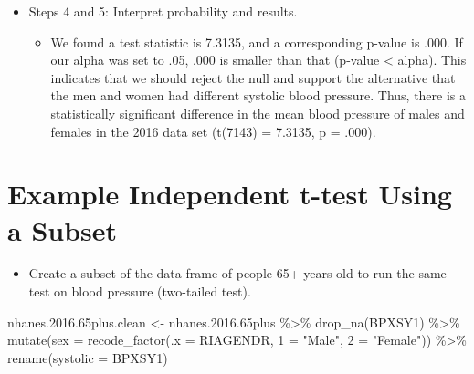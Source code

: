 \documentclass[
  letterpaper,
  DIV=11,
  numbers=noendperiod]{scrreprt}
\newenvironment{Shaded}{\begin{snugshade}}{\end{snugshade}}
\newcommand{\AttributeTok}[1]{\textcolor[rgb]{0.40,0.45,0.13}{#1}}
\newcommand{\FloatTok}[1]{\textcolor[rgb]{0.68,0.00,0.00}{#1}}
\newcommand{\FunctionTok}[1]{\textcolor[rgb]{0.28,0.35,0.67}{#1}}
\newcommand{\NormalTok}[1]{\textcolor[rgb]{0.00,0.23,0.31}{#1}}
\newcommand{\OtherTok}[1]{\textcolor[rgb]{0.00,0.23,0.31}{#1}}
\newcommand{\SpecialCharTok}[1]{\textcolor[rgb]{0.37,0.37,0.37}{#1}}
\newcommand{\StringTok}[1]{\textcolor[rgb]{0.13,0.47,0.30}{#1}}
\providecommand{\tightlist}{%
  \setlength{\itemsep}{0pt}\setlength{\parskip}{0pt}}\usepackage{longtable,booktabs,array}
\begin{document}
\begin{itemize}
\tightlist
\item
  Steps 4 and 5: Interpret probability and results.

  \begin{itemize}
  \tightlist
  \item
    We found a test statistic is 7.3135, and a corresponding p-value is
    .000. If our alpha was set to .05, .000 is smaller than that
    (p-value \textless{} alpha). This indicates that we should reject
    the null and support the alternative that the men and women had
    different systolic blood pressure. Thus, there is a statistically
    significant difference in the mean blood pressure of males and
    females in the 2016 data set (t(7143) = 7.3135, p = .000).
  \end{itemize}
\end{itemize}

\section{Example Independent t-test Using a
Subset}\label{example-independent-t-test-using-a-subset}

\begin{itemize}
\tightlist
\item
  Create a subset of the data frame of people 65+ years old to run the
  same test on blood pressure (two-tailed test).
\end{itemize}

\begin{Shaded}
\begin{Highlighting}[]
\NormalTok{nhanes.}\FloatTok{2016.65}\NormalTok{plus.clean }\OtherTok{\textless{}{-}}\NormalTok{ nhanes.}\FloatTok{2016.65}\NormalTok{plus }\SpecialCharTok{\%\textgreater{}\%}
    \FunctionTok{drop\_na}\NormalTok{(BPXSY1) }\SpecialCharTok{\%\textgreater{}\%}
    \FunctionTok{mutate}\NormalTok{(}\AttributeTok{sex =} \FunctionTok{recode\_factor}\NormalTok{(}\AttributeTok{.x =}\NormalTok{ RIAGENDR, }\StringTok{\textasciigrave{}}\AttributeTok{1}\StringTok{\textasciigrave{}} \OtherTok{=} \StringTok{"Male"}\NormalTok{, }\StringTok{\textasciigrave{}}\AttributeTok{2}\StringTok{\textasciigrave{}} \OtherTok{=} \StringTok{"Female"}\NormalTok{)) }\SpecialCharTok{\%\textgreater{}\%}
    \FunctionTok{rename}\NormalTok{(}\AttributeTok{systolic =}\NormalTok{ BPXSY1)}
\end{Highlighting}
\end{Shaded}
\end{document}
